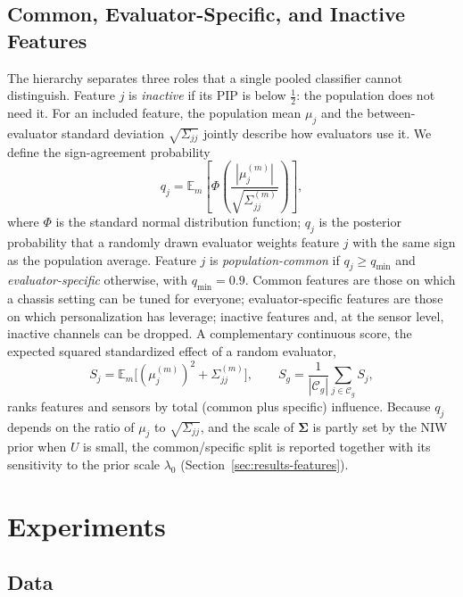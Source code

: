 \documentclass[lettersize,journal]{IEEEtran}
\newcommand{\E}{\mathbb{E}}
\begin{document}
\subsection{Common, Evaluator-Specific, and Inactive Features}
\label{sec:decomposition}

The hierarchy separates three roles that a single pooled classifier cannot distinguish. Feature $j$ is \emph{inactive} if its PIP is below $\tfrac12$: the population does not need it. For an included feature, the population mean $\mu_j$ and the between-evaluator standard deviation $\sqrt{\Sigma_{jj}}$ jointly describe how evaluators use it. We define the sign-agreement probability
\begin{equation}
 q_j=\E_m\!\left[\Phi\!\left(\frac{|\mu^{(m)}_j|}{\sqrt{\Sigma^{(m)}_{jj}}}\right)\right],
 \label{eq:sign-agreement}
\end{equation}
where $\Phi$ is the standard normal distribution function; $q_j$ is the posterior probability that a randomly drawn evaluator weights feature $j$ with the same sign as the population average. Feature $j$ is \emph{population-common} if $q_j\ge q_{\min}$ and \emph{evaluator-specific} otherwise, with $q_{\min}=0.9$. Common features are those on which a chassis setting can be tuned for everyone; evaluator-specific features are those on which personalization has leverage; inactive features and, at the sensor level, inactive channels can be dropped. A complementary continuous score, the expected squared standardized effect of a random evaluator,
\begin{equation}
 S_j=\E_m\big[(\mu^{(m)}_j)^2+\Sigma^{(m)}_{jj}\big],\qquad
 S_g=\frac{1}{|\mathcal{C}_g|}\sum_{j\in\mathcal{C}_g}S_j,
 \label{eq:effect-score}
\end{equation}
ranks features and sensors by total (common plus specific) influence. Because $q_j$ depends on the ratio of $\mu_j$ to $\sqrt{\Sigma_{jj}}$, and the scale of $\bm\Sigma$ is partly set by the NIW prior when $U$ is small, the common/specific split is reported together with its sensitivity to the prior scale $\lambda_0$ (Section~\ref{sec:results-features}).

\section{Experiments}
\label{sec:experiments}

\subsection{Data}
\label{sec:data}
\end{document}
